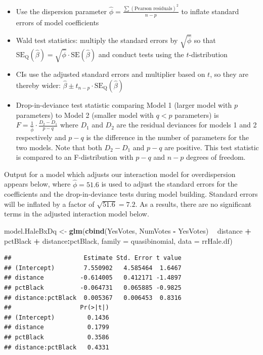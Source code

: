 \documentclass[
]{krantz}
\newenvironment{Shaded}{\begin{snugshade}}{\end{snugshade}}
\newcommand{\DataTypeTok}[1]{\textcolor[rgb]{0.27,0.27,0.27}{#1}}
\newcommand{\KeywordTok}[1]{\textcolor[rgb]{0.27,0.27,0.27}{\textbf{#1}}}
\newcommand{\NormalTok}[1]{#1}
\newcommand{\OperatorTok}[1]{\textcolor[rgb]{0.43,0.43,0.43}{\textbf{#1}}}
\newcommand{\StringTok}[1]{\textcolor[rgb]{0.5,0.5,0.5}{#1}}
\providecommand{\tightlist}{%
  \setlength{\itemsep}{0pt}\setlength{\parskip}{0pt}}
\begin{document}
\begin{itemize}
\tightlist
\item
  Use the dispersion parameter \(\hat\phi=\frac{\sum(\textrm{Pearson residuals})^2}{n-p}\) to inflate standard errors of model coefficients
\item
  Wald test statistics: multiply the standard errors by \(\sqrt{\hat{\phi}}\) so that \(\textrm{SE}_\textrm{Q}(\hat\beta)=\sqrt{\hat\phi}\cdot\textrm{SE}(\hat\beta)\) and conduct tests using the \(t\)-distribution
\item
  CIs use the adjusted standard errors and multiplier based on \(t\), so they are thereby wider: \(\hat\beta \pm t_{n-p} \cdot \textrm{SE}_\textrm{Q}(\hat\beta)\)
\item
  Drop-in-deviance test statistic comparing Model 1 (larger model with \(p\) parameters) to Model 2 (smaller model with \(q<p\) parameters) is \(F = \frac{1}{\hat\phi} \cdot \frac{D_2 - D_1}{p-q}\) where \(D_1\) and \(D_2\) are the residual deviances for models 1 and 2 respectively and \(p-q\) is the difference in the number of parameters for the two models. Note that both \(D_2-D_1\) and \(p-q\) are positive. This test statistic is compared to an F-distribution with \(p-q\) and \(n-p\) degrees of freedom.
\end{itemize}

Output for a model which adjusts our interaction model for overdispersion appears below, where \(\hat{\phi}=51.6\) is used to adjust the standard errors for the coefficients and the drop-in-deviance tests during model building. Standard errors will be inflated by a factor of \(\sqrt{51.6}=7.2\). As a results, there are no significant terms in the adjusted interaction model below.

\begin{Shaded}
\begin{Highlighting}[]
\NormalTok{model.HaleBxDq <-}\StringTok{ }\KeywordTok{glm}\NormalTok{(}\KeywordTok{cbind}\NormalTok{(YesVotes, NumVotes }\OperatorTok{-}\StringTok{ }\NormalTok{YesVotes) }\OperatorTok{~}
\StringTok{  }\NormalTok{distance }\OperatorTok{+}\StringTok{ }\NormalTok{pctBlack }\OperatorTok{+}\StringTok{ }\NormalTok{distance}\OperatorTok{:}\NormalTok{pctBlack, }
  \DataTypeTok{family =}\NormalTok{ quasibinomial, }\DataTypeTok{data =}\NormalTok{ rrHale.df)}
\end{Highlighting}
\end{Shaded}

\begin{verbatim}
##                    Estimate Std. Error t value
## (Intercept)        7.550902   4.585464  1.6467
## distance          -0.614005   0.412171 -1.4897
## pctBlack          -0.064731   0.065885 -0.9825
## distance:pctBlack  0.005367   0.006453  0.8316
##                   Pr(>|t|)
## (Intercept)         0.1436
## distance            0.1799
## pctBlack            0.3586
## distance:pctBlack   0.4331
\end{verbatim}
\end{document}
